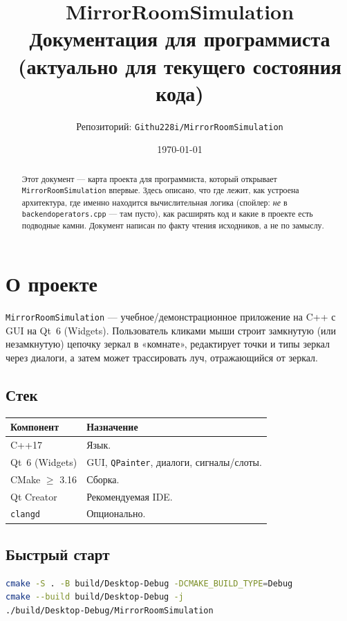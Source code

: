 \documentclass[a4paper,11pt]{article}
\title{\textbf{MirrorRoomSimulation}\\[0.3em]
       \large Документация для программиста\\[0.2em]
       \normalsize (актуально для текущего состояния кода)}
\author{Репозиторий: \texttt{Githu228i/MirrorRoomSimulation}}
\date{\today}
\newcommand{\file}[1]{\texttt{#1}}
\newcommand{\code}[1]{\texttt{#1}}
\begin{document}
\maketitle

\begin{abstract}
\noindent
Этот документ — карта проекта для программиста, который открывает
\file{MirrorRoomSimulation} впервые. Здесь описано, что где лежит, как
устроена архитектура, где именно находится вычислительная логика
(спойлер: \emph{не} в \file{backendoperators.cpp} — там пусто),
как расширять код и какие в проекте есть подводные камни. Документ
написан по факту чтения исходников, а не по замыслу.
\end{abstract}

\tableofcontents
\newpage

\section{О проекте}

\file{MirrorRoomSimulation} — учебное/демонстрационное приложение на C++
с GUI на Qt~6 (Widgets). Пользователь кликами мыши строит замкнутую
(или незамкнутую) цепочку зеркал в «комнате», редактирует точки и типы
зеркал через диалоги, а затем может трассировать луч, отражающийся от
зеркал.

\subsection{Стек}

\begin{longtable}{@{}p{4cm}p{10.5cm}@{}}
\toprule
\textbf{Компонент} & \textbf{Назначение} \\ \midrule
\endhead
C++17 & Язык. \\
Qt~6 (Widgets) & GUI, \code{QPainter}, диалоги, сигналы/слоты. \\
CMake $\geq$ 3.16 & Сборка. \\
Qt Creator & Рекомендуемая IDE. \\
\code{clangd} & Опционально. \\
\bottomrule
\end{longtable}

\subsection{Быстрый старт}

\begin{lstlisting}[language=bash,caption={Сборка}]
cmake -S . -B build/Desktop-Debug -DCMAKE_BUILD_TYPE=Debug
cmake --build build/Desktop-Debug -j
./build/Desktop-Debug/MirrorRoomSimulation
\end{lstlisting}
\end{document}
